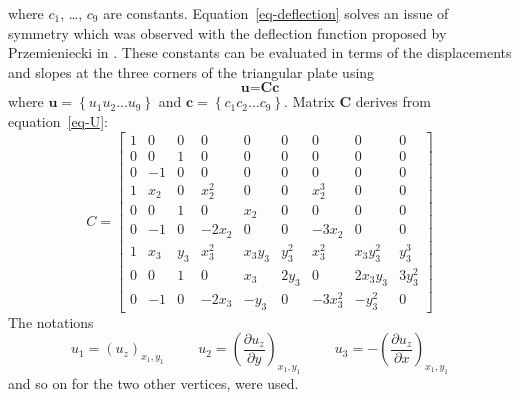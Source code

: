 \documentclass{llncs}
\begin{document}
where $c_1$, \ldots , $c_9$ are constants. Equation~\ref{eq-deflection} solves an issue of symmetry which was observed with the deflection function proposed by Przemieniecki in \cite{Przemieniecki68}. These constants can be evaluated in terms of the displacements and slopes at the three corners of the triangular plate using 
\begin{equation}
\textbf{u} = \textbf{Cc}
\label{eq-U}
\end{equation} 
where $\textbf{u} = \left\{u_1 u_2 \ldots u_9 \right\} $ and $\textbf{c} = \left\{c_1 c_2 \ldots c_9 \right\} $. Matrix $\textbf{C}$ derives from equation~\ref{eq-U}:
\begin{equation}
C = 
	\begin{bmatrix}
	1 & 0 & 0 & 0 & 0 & 0 & 0 & 0 & 0 \\
 	0 & 0 & 1 & 0 & 0 & 0 & 0 & 0 & 0 \\
	0 & -1 & 0 & 0 & 0 & 0 & 0 & 0 & 0 \\
	1 & x_2 & 0 & x_2^2 & 0 & 0 & x_2^3 & 0 & 0 \\
	0 & 0 & 1 & 0 & x_2 & 0 & 0 & 0 & 0 \\
	0 & -1 & 0 & -2x_2 & 0 & 0 & -3x_2 & 0 & 0 \\
	1 & x_3 & y_3 & x_3^2 & x_3y_3 & y_3^2 & x_3^2 & x_3y_3^2& y_3^3 \\
	0 & 0 & 1 & 0 & x_3 & 2y_3 & 0 & 2x_3y_3 & 3y_3^2 \\
	0 & -1 & 0 & -2x_3 & -y_3 & 0 & -3x_3^2 & -y_3^2 & 0
	\end{bmatrix}
\end{equation} 
The notations 
\begin{equation}
u_1 = (u_z)_{x_1,y_1} \hspace{1cm} u_2 = \left(\frac{\partial u_z}{\partial y}\right)_{x_1,y_1} \hspace{1cm} u_3 = - \left(\frac{\partial u_z}{\partial x}\right)_{x_1,y_1}
\end{equation} 
and so on for the two other vertices, were used.
\end{document}
